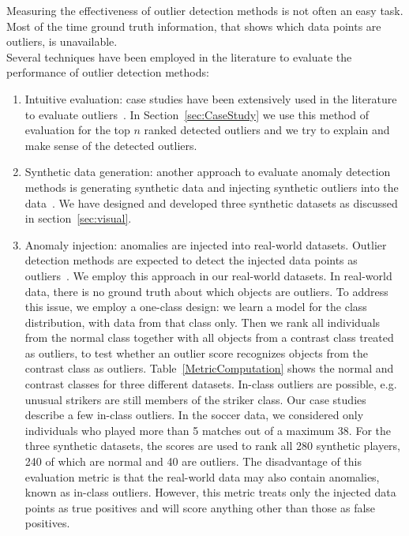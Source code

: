 {				Measuring the effectiveness of outlier detection methods is not often an easy task. Most of the time ground truth information, that shows which data points are outliers, is unavailable. \\
				Several techniques have been employed in the literature to evaluate the performance of outlier detection methods:
				\begin{enumerate}
					\item Intuitive evaluation: case studies have been extensively used in the literature to evaluate outliers~\cite{aggarwal2013}. In Section~\ref{sec:CaseStudy} we use this method of evaluation for the top $n$ ranked detected outliers and we try to explain and make sense of the detected outliers. 	
					\item Synthetic data generation: another approach to evaluate anomaly detection methods is generating synthetic data and injecting synthetic outliers into the data~\cite{aggarwal2013}. We have designed and developed three synthetic datasets as discussed in section~\ref{sec:visual}.
					\item Anomaly injection: anomalies are injected into real-world datasets. Outlier detection methods are expected to detect the injected data points as outliers~\cite{Akoglu2015}. We employ this approach in our real-world datasets.
						In real-world data, there is no ground truth about which objects are outliers. To address this issue, we employ a one-class design: we learn a model for the class distribution, with data from that class only. 
						Then we rank all individuals from the normal class together with all objects from a contrast class treated as outliers, to test whether an outlier score recognizes objects from the contrast class as outliers.
						Table~\ref{MetricComputation} shows the normal and contrast classes for three different datasets.  In-class outliers are possible, e.g. unusual strikers are still members of the striker class. Our case studies describe a few in-class outliers. In the soccer data, we considered only individuals who played more than 5 matches out of a maximum 38. For the three synthetic datasets, the scores are used to rank all 280 synthetic  players, 240 of which are normal and 40 are outliers.
					The disadvantage of this evaluation metric is that the real-world data may also contain anomalies, known as in-class outliers. However, this metric treats only the injected data points as true positives and will score anything other than those as false positives.
				\end{enumerate}
			
}
